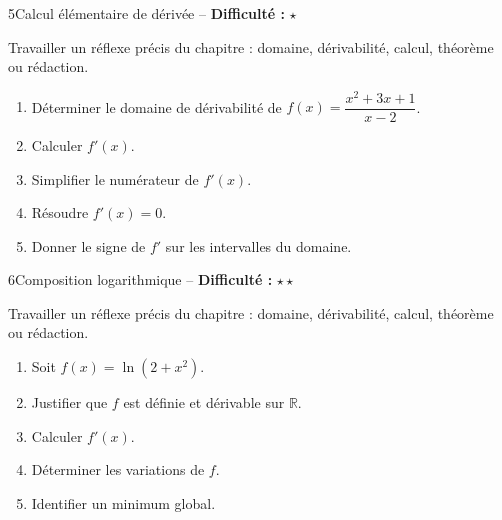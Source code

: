 \documentclass[11pt,a4paper]{article}
\newcommand{\R}{\mathbb{R}}
\newcommand{\etoiles}[1]{\textbf{Difficulté :} #1}
\begin{document}
\begin{exobox}{5}{Calcul élémentaire de dérivée -- \etoiles{$\star$}}

\begin{objectifbox}
Travailler un réflexe précis du chapitre : domaine, dérivabilité, calcul, théorème ou rédaction.
\end{objectifbox}

\begin{enumerate}

\item Déterminer le domaine de dérivabilité de $f(x)=\dfrac{x^2+3x+1}{x-2}$.

\item Calculer $f'(x)$.

\item Simplifier le numérateur de $f'(x)$.

\item Résoudre $f'(x)=0$.

\item Donner le signe de $f'$ sur les intervalles du domaine.

\end{enumerate}

\end{exobox}


\begin{exobox}{6}{Composition logarithmique -- \etoiles{$\star\star$}}

\begin{objectifbox}
Travailler un réflexe précis du chapitre : domaine, dérivabilité, calcul, théorème ou rédaction.
\end{objectifbox}

\begin{enumerate}

\item Soit $f(x)=\ln(2+x^2)$.

\item Justifier que $f$ est définie et dérivable sur $\R$.

\item Calculer $f'(x)$.

\item Déterminer les variations de $f$.

\item Identifier un minimum global.

\end{enumerate}

\end{exobox}
\end{document}
